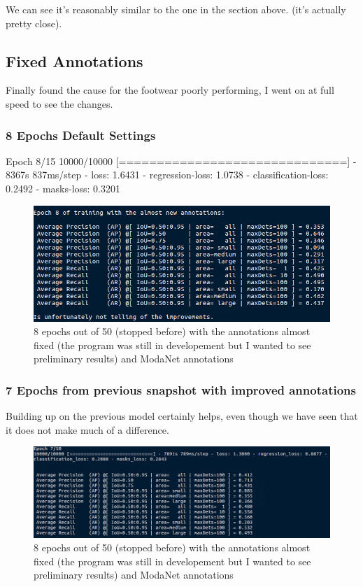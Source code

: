 We can see it's reasonably similar to the one in the section above. (it's actually pretty close).



\subsection{Fixed Annotations}

Finally found the cause for the footwear poorly performing, I went on at full speed to see the changes.

\subsubsection{8 Epochs Default Settings}

Epoch 8/15
10000/10000 [==============================] - 8367s 837ms/step - loss: 1.6431 - regression-loss: 1.0738 - classification-loss: 0.2492 - masks-loss: 0.3201

\begin{figure}[H]
	\centering
	\includegraphics[width=\linewidth]{figures/train/8almostnew}
	\caption{8 epochs out of 50 (stopped before) with the annotations almost fixed (the program was still in developement but I wanted to see preliminary results) and ModaNet annotations}
	\label{f:train-8almostnew}
\end{figure}


\subsubsection{7 Epochs from previous snapshot with improved annotations}

Building up on the previous model certainly helps, even though we have seen that it does not make much of a difference.

\begin{figure}[H]
	\centering
	\includegraphics[width=\linewidth]{figures/train/7afteralmostnewwrongdoubleadded}
	\caption{8 epochs out of 50 (stopped before) with the annotations almost fixed (the program was still in developement but I wanted to see preliminary results) and ModaNet annotations}
	\label{f:train-7afteralmostnewwrongdoubleadded}
\end{figure}

